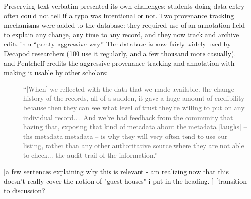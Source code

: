 Preserving text verbatim presented its own challenges: students doing data entry often could not tell if a typo was intentional or not. Two provenance tracking mechanisms were added to the database: they required use of an annotation field to explain any change, any time to any record, and they now track and archive edits in a “pretty aggressive way”
The database is now fairly widely used by Decapod researchers (100 use it regularly, and a few thousand more casually), and Pentcheff credits the aggressive provenance-tracking and annotation with making it usable by other scholars:
\begin{quote}
“[When] we reflected with the data that we made available, the change history of the records, all of a sudden, it gave a huge amount of credibility because then they can see what level of trust they're willing to put on any individual record.... And we've had feedback from the community that having that, exposing that kind of metadata about the metadata [laughs] – the metadata metadata – is why they will very often tend to use our listing, rather than any other authoritative source where they are not able to check... the audit trail of the information.”
\end{quote}


[a few sentences explaining why this is relevant - am realizing now that this doesn't really cover the notion of "guest houses" i put in the heading. ]
[transition to discussion?]

